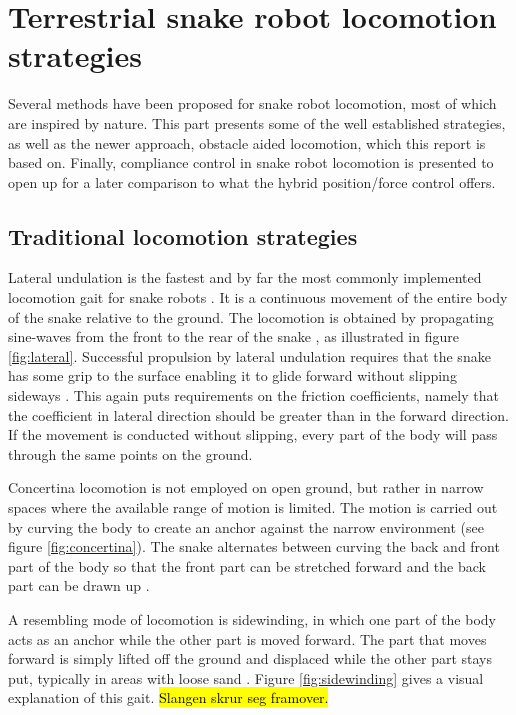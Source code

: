 \section{Terrestrial snake robot locomotion strategies}\label{sec:locomotion}



Several methods have been proposed for snake robot locomotion, most of which are inspired by nature. This part presents some of the well established strategies, as well as the newer approach, obstacle aided locomotion, which this report is based on. Finally, compliance control in snake robot locomotion is presented to open up for a later comparison to what the hybrid position/force control offers.

\subsection{Traditional locomotion strategies}\label{subsec:traditional-loco}

Lateral undulation is the fastest and by far the most commonly implemented locomotion gait for snake robots \cite{sanfilippo2017perception}.
It is a continuous movement of the entire body of the snake relative to the ground. The locomotion is obtained by propagating sine-waves from the front to the rear of the snake \cite{transeth2006developments}, as illustrated in figure \ref{fig:lateral}.
Successful propulsion by lateral undulation requires that the snake has some grip to the surface enabling it to glide forward without slipping sideways \cite{liljeback2012review}. This again puts requirements on the friction coefficients, namely that the coefficient in lateral direction should be greater than in the forward
direction. If the movement is conducted without slipping, every part of the body will pass through the same points on the ground.

Concertina locomotion is not employed on open ground, but rather in narrow spaces where the available range of motion is limited. The motion is carried out by curving the body
to create an anchor against the narrow environment (see figure \ref{fig:concertina}). The snake alternates between curving the back and front part of the body so that the front part can be stretched forward and the back part can be drawn up \cite{liljeback2012snake}.

A resembling mode of locomotion is sidewinding, in which one part of the body acts as an anchor while the other part is moved forward. The part that moves forward is simply lifted off the ground and displaced while the other part stays put, typically in areas with loose sand \cite{liljeback2012snake}. Figure \ref{fig:sidewinding} gives a visual explanation of this gait. \hl{Slangen skrur seg framover.}

